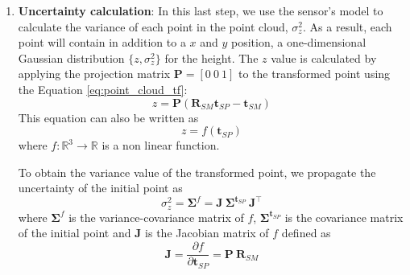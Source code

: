 \begin{enumerate}
    \item \textbf{Uncertainty calculation}:
        In this last step, we use the sensor's model to calculate the variance
        of each point in the point cloud, $\sigma^2_z$.
        As a result, each point will contain in addition to a $x$ and $y$
        position, a one-dimensional Gaussian distribution $\{z, \sigma^2_z\}$
        for the height.
        The $z$ value is calculated by applying the projection matrix
        $\mathbf{P} = [0 \ 0 \ 1]$ to the transformed point using the Equation
        \ref{eq:point_cloud_tf}:
        \begin{equation}
            z = \mathbf{P}(
                \mathbf{R}_{SM} \mathbf{t}_{SP} -
                \mathbf{t}_{SM})
        \end{equation}
        This equation can also be written as
        \begin{equation}
            z = f(\mathbf{t}_{SP})
        \end{equation}
        where
        $f : \mathbb{R}^3 \rightarrow \mathbb{R}$ is a non linear function.

        To obtain the variance value of the transformed point, we propagate
        the uncertainty \parencite{Ochoa2006} of the initial point as
        \begin{equation}
            \sigma^2_z = \mathbf{\Sigma}^f =
            \mathbf{J} \ \mathbf{\Sigma}^{\mathbf{t}_{SP}} \
            \mathbf{J}^\intercal
        \end{equation}
        where $\mathbf{\Sigma}^f$ is the variance-covariance matrix of $f$,
        $\mathbf{\Sigma}^{\mathbf{t}_{SP}}$ is the covariance matrix of
        the initial point and
        $\mathbf{J}$ is the Jacobian matrix of $f$ defined as
        \begin{equation}
            \mathbf{J} = \frac{\partial f}{\partial \mathbf{t}_{SP}} =
            \mathbf{P} \ \mathbf{R}_{SM}
        \end{equation}


\end{enumerate}
